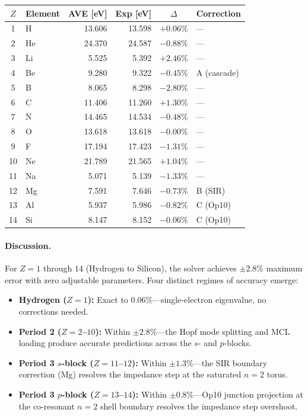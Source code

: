 \begin{center}
\small
\renewcommand{\arraystretch}{1.2}
\begin{tabular}{clrrcl}
\toprule
\textbf{$Z$} & \textbf{Element} & \textbf{AVE [eV]} & \textbf{Exp [eV]} & \textbf{$\Delta$} & \textbf{Correction} \\
\midrule
1  & H  & 13.606 & 13.598 & $+0.06\%$ & --- \\
2  & He & 24.370 & 24.587 & $-0.88\%$ & --- \\
3  & Li &  5.525 &  5.392 & $+2.46\%$ & --- \\
4  & Be &  9.280 &  9.322 & $-0.45\%$ & A (cascade) \\
5  & B  &  8.065 &  8.298 & $-2.80\%$ & --- \\
6  & C  & 11.406 & 11.260 & $+1.30\%$ & --- \\
7  & N  & 14.465 & 14.534 & $-0.48\%$ & --- \\
8  & O  & 13.618 & 13.618 & $-0.00\%$ & --- \\
9  & F  & 17.194 & 17.423 & $-1.31\%$ & --- \\
10 & Ne & 21.789 & 21.565 & $+1.04\%$ & --- \\
11 & Na &  5.071 &  5.139 & $-1.33\%$ & --- \\
12 & Mg &  7.591 &  7.646 & $-0.73\%$ & B (SIR) \\
13 & Al &  5.937 &  5.986 & $-0.82\%$ & C (Op10) \\
14 & Si &  8.147 &  8.152 & $-0.06\%$ & C (Op10) \\
\bottomrule
\end{tabular}
\end{center}

\paragraph{Discussion.}
For $Z = 1$ through $14$ (Hydrogen to Silicon), the solver achieves $\pm 2.8\%$ maximum error with zero adjustable parameters.  Four distinct regimes of accuracy emerge:
\begin{itemize}
    \item \textbf{Hydrogen ($Z = 1$):} Exact to $0.06\%$---single-electron eigenvalue, no corrections needed.
    \item \textbf{Period 2 ($Z = 2$--$10$):} Within $\pm2.8\%$---the Hopf mode splitting and MCL loading produce accurate predictions across the $s$- and $p$-blocks.
    \item \textbf{Period 3 $s$-block ($Z = 11$--$12$):} Within $\pm1.3\%$---the SIR boundary correction (Mg) resolves the impedance step at the saturated $n = 2$ torus.
    \item \textbf{Period 3 $p$-block ($Z = 13$--$14$):} Within $\pm0.8\%$---Op10 junction projection at the co-resonant $n = 2$ shell boundary resolves the impedance step overshoot.
\end{itemize}


